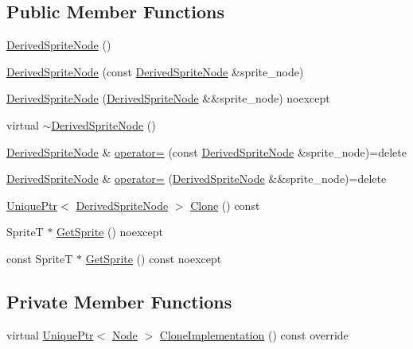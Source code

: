 \subsection*{Public Member Functions}
\begin{DoxyCompactItemize}
\item 
\hyperlink{classmage_1_1_derived_sprite_node_a535c0a655a02c414d05596a3959e26d9}{Derived\+Sprite\+Node} ()
\item 
\hyperlink{classmage_1_1_derived_sprite_node_af0e8a99b4fb15fd71f4c642999fed2cf}{Derived\+Sprite\+Node} (const \hyperlink{classmage_1_1_derived_sprite_node}{Derived\+Sprite\+Node} \&sprite\+\_\+node)
\item 
\hyperlink{classmage_1_1_derived_sprite_node_a9ef3c0d79ef13edde2fab7e1f3c5d451}{Derived\+Sprite\+Node} (\hyperlink{classmage_1_1_derived_sprite_node}{Derived\+Sprite\+Node} \&\&sprite\+\_\+node) noexcept
\item 
virtual \hyperlink{classmage_1_1_derived_sprite_node_a0ff9a3b661a72ae3d200dfe50dc311fc}{$\sim$\+Derived\+Sprite\+Node} ()
\item 
\hyperlink{classmage_1_1_derived_sprite_node}{Derived\+Sprite\+Node} \& \hyperlink{classmage_1_1_derived_sprite_node_a1dd542f0e851b1e289bb127691f0800b}{operator=} (const \hyperlink{classmage_1_1_derived_sprite_node}{Derived\+Sprite\+Node} \&sprite\+\_\+node)=delete
\item 
\hyperlink{classmage_1_1_derived_sprite_node}{Derived\+Sprite\+Node} \& \hyperlink{classmage_1_1_derived_sprite_node_addd4a6c5019df92918e253e41f4e94ac}{operator=} (\hyperlink{classmage_1_1_derived_sprite_node}{Derived\+Sprite\+Node} \&\&sprite\+\_\+node)=delete
\item 
\hyperlink{namespacemage_a3316d7143a973e37adf1110f2e80ca31}{Unique\+Ptr}$<$ \hyperlink{classmage_1_1_derived_sprite_node}{Derived\+Sprite\+Node} $>$ \hyperlink{classmage_1_1_derived_sprite_node_a3a409447de581b0ed39625a9d3beab33}{Clone} () const
\item 
SpriteT $\ast$ \hyperlink{classmage_1_1_derived_sprite_node_a4f380d16fcd3804d08d1f6f42ecc4780}{Get\+Sprite} () noexcept
\item 
const SpriteT $\ast$ \hyperlink{classmage_1_1_derived_sprite_node_a9daf3412c118dcb50f0175d3d00be9bc}{Get\+Sprite} () const noexcept
\end{DoxyCompactItemize}
\subsection*{Private Member Functions}
\begin{DoxyCompactItemize}
\item 
virtual \hyperlink{namespacemage_a3316d7143a973e37adf1110f2e80ca31}{Unique\+Ptr}$<$ \hyperlink{classmage_1_1_node}{Node} $>$ \hyperlink{classmage_1_1_derived_sprite_node_ae1aa2b80d4ff8688635df017826c11a5}{Clone\+Implementation} () const override
\end{DoxyCompactItemize}
